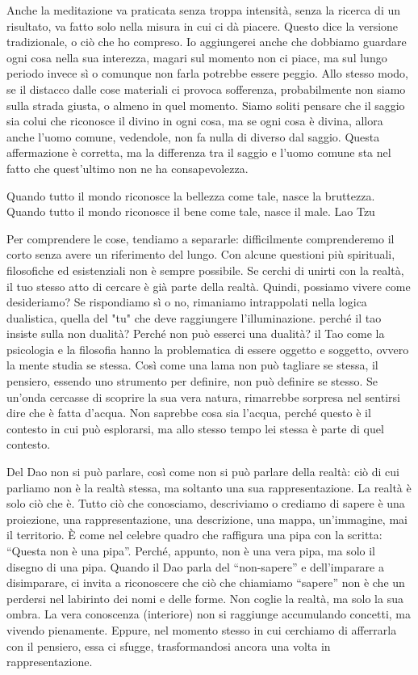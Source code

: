 \documentclass[12pt]{book} %
\begin{document}
Anche la meditazione va praticata senza troppa intensità, senza la ricerca di un risultato, va fatto solo nella misura in cui ci dà piacere. Questo dice la versione tradizionale, o ciò che ho compreso. Io aggiungerei anche che dobbiamo guardare ogni cosa nella sua interezza, magari sul momento non ci piace, ma sul lungo periodo invece sì o comunque non farla potrebbe essere peggio. Allo stesso modo, se il distacco dalle cose materiali ci provoca sofferenza, probabilmente non siamo sulla strada giusta, o almeno in quel momento.
Siamo soliti pensare che il saggio sia colui che riconosce il divino in ogni cosa, ma se ogni cosa è divina, allora anche l'uomo comune, vedendole, non fa nulla di diverso dal saggio. Questa affermazione è corretta, ma la differenza tra il saggio e l'uomo comune sta nel fatto che quest'ultimo non ne ha consapevolezza. 

Quando tutto il mondo riconosce la bellezza come tale, nasce la bruttezza.
Quando tutto il mondo riconosce il bene come tale, nasce il male.
Lao Tzu

Per comprendere le cose, tendiamo a separarle: difficilmente comprenderemo il corto senza avere un riferimento del lungo. Con alcune questioni più spirituali, filosofiche ed esistenziali non è sempre possibile. 
Se cerchi di unirti con la realtà, il tuo stesso atto di cercare è già parte della realtà. Quindi, possiamo vivere come desideriamo? Se rispondiamo sì o no, rimaniamo intrappolati nella logica dualistica, quella del "tu" che deve raggiungere l'illuminazione.
perché il tao insiste sulla non dualità? Perché non può esserci una dualità? il Tao come la psicologia e la filosofia hanno la problematica di essere oggetto e soggetto, ovvero la mente studia se stessa. 
Così come una lama non può tagliare se stessa, il pensiero, essendo uno strumento per definire, non può definire se stesso.
Se un'onda cercasse di scoprire la sua vera natura, rimarrebbe sorpresa nel sentirsi dire che è fatta d'acqua. Non saprebbe cosa sia l'acqua, perché questo è il contesto in cui può esplorarsi, ma allo stesso tempo lei stessa è parte di quel contesto.

Del Dao non si può parlare, così come non si può parlare della realtà: ciò di cui parliamo non è la realtà stessa, ma soltanto una sua rappresentazione.
La realtà è solo ciò che è. Tutto ciò che conosciamo, descriviamo o crediamo di sapere è una proiezione, una rappresentazione, una descrizione, una mappa, un'immagine, mai il territorio.
È come nel celebre quadro che raffigura una pipa con la scritta: “Questa non è una pipa”. Perché, appunto, non è una vera pipa, ma solo il disegno di una pipa.
Quando il Dao parla del “non-sapere” e dell’imparare a disimparare, ci invita a riconoscere che ciò che chiamiamo “sapere” non è che un perdersi nel labirinto dei nomi e delle forme. Non coglie la realtà, ma solo la sua ombra.
La vera conoscenza (interiore) non si raggiunge accumulando concetti, ma vivendo pienamente. Eppure, nel momento stesso in cui cerchiamo di afferrarla con il pensiero, essa ci sfugge, trasformandosi ancora una volta in rappresentazione. 
\end{document}

